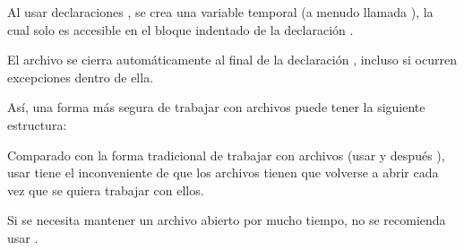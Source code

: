 Al usar declaraciones , se crea una variable temporal (a menudo llamada ), la cual solo es accesible en el bloque indentado de la declaración .


El archivo se cierra automáticamente al final de la declaración , incluso si ocurren excepciones dentro de ella.

Así, una forma más segura de trabajar con archivos puede tener la siguiente estructura:


Comparado con la forma tradicional de trabajar con archivos (usar  y después ), usar  tiene el inconveniente de que los archivos tienen que volverse a abrir cada vez que se quiera trabajar con ellos.

Si se necesita mantener un archivo abierto por mucho tiempo, no se recomienda usar .

\clearpage